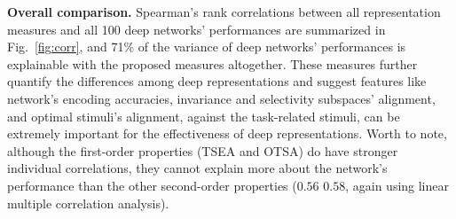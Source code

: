 \documentclass[fleqn]{article} %
\begin{document}
{\bf Overall comparison.}
Spearman's rank correlations between all representation measures and all 100 deep networks' performances are summarized in Fig.~\ref{fig:corr}, and 71\% of the variance of deep networks' performances is explainable with the proposed measures altogether.
These measures further quantify the differences among deep representations and suggest features like network's 
encoding accuracies, invariance and selectivity subspaces' alignment, and optimal stimuli's alignment, against the task-related stimuli, can be extremely important for the effectiveness of deep representations.
Worth to note, although the first-order properties (TSEA and OTSA) do have stronger individual correlations, they cannot explain more about the network's performance than the other second-order properties ($0.56$ \vs $0.58$, again using linear multiple correlation analysis).



\end{document}
